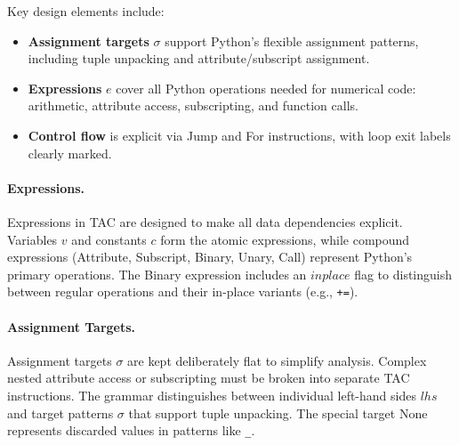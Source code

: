 Key design elements include:
\begin{itemize}
    \item \textbf{Assignment targets} $\sigma$ support Python's flexible assignment patterns, including tuple unpacking and attribute/subscript assignment.
    \item \textbf{Expressions} $e$ cover all Python operations needed for numerical code: arithmetic, attribute access, subscripting, and function calls.
    \item \textbf{Control flow} is explicit via \textsf{Jump} and \textsf{For} instructions, with loop exit labels clearly marked.
\end{itemize}

\paragraph{Expressions.}
Expressions in TAC are designed to make all data dependencies explicit. Variables $v$ and constants $c$ form the atomic expressions, while compound expressions (\textsf{Attribute}, \textsf{Subscript}, \textsf{Binary}, \textsf{Unary}, \textsf{Call}) represent Python's primary operations. The \textsf{Binary} expression includes an $inplace$ flag to distinguish between regular operations and their in-place variants (e.g., \texttt{+=}).

\paragraph{Assignment Targets.}
Assignment targets $\sigma$ are kept deliberately flat to simplify analysis. Complex nested attribute access or subscripting must be broken into separate TAC instructions. The grammar distinguishes between individual left-hand sides $lhs$ and target patterns $\sigma$ that support tuple unpacking. The special target \textsf{None} represents discarded values in patterns like \texttt{\_}.

